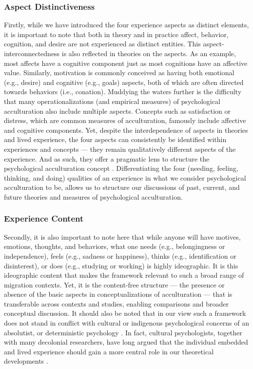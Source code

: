 \documentclass[man, 12pt, a4paper, mask]{apa7}
\begin{document}
\subsubsection{Aspect Distinctiveness}
Firstly, while we have introduced the four experience aspects as distinct elements, it is important to note that both in theory and in practice affect, behavior, cognition, and desire are not experienced as distinct entities. This aspect-interconnectedness is also reflected in theories on the aspects. As an example, most affects have a cognitive component just as most cognitions have an affective value. Similarly, motivation is commonly conceived as having both emotional (e.g., desire) and cognitive (e.g., goals) aspects, both of which are often directed towards behaviors (i.e., conation). Muddying the waters further is the difficulty that many operationalizations (and empirical measures) of psychological acculturation also include multiple aspects. Concepts such as satisfaction or distress, which are common measures of acculturation, famously include affective and cognitive components. Yet, despite the interdependence of aspects in theories and lived experience, the four aspects can consistently be identified within experiences and concepts --- they remain qualitatively different aspects of the experience. And as such, they offer a pragmatic lens to structure the psychological acculturation concept \citep{Kuhn1962}. Differentiating the four (needing, feeling, thinking, and doing) qualities of an experience in what we consider psychological acculturation to be, allows us to structure our discussions of past, current, and future theories and measures of psychological acculturation.

\subsubsection{Experience Content}
Secondly, it is also important to note here that while anyone will have motives, emotions, thoughts, and behaviors, what one needs (e.g., belongingness or independence), feels (e.g., sadness or happiness), thinks (e.g., identification or disinterest), or does (e.g., studying or working) is highly ideographic. It is this ideographic content that makes the framework relevant to such a broad range of migration contexts. Yet, it is the content-free structure --- the presence or absence of the basic aspects in conceptualizations of acculturation --- that is transferable across contexts and studies, enabling comparisons and broader conceptual discussion. It should also be noted that in our view such a framework does not stand in conflict with cultural or indigenous psychological concerns of an absolutist, or deterministic psychology \citep[e.g.,][]{Kim2006a}. In fact, cultural psychologists, together with many decolonial researchers, have long argued that the individual embedded and lived experience should gain a more central role in our theoretical developments \citep[e.g., ontological turn;][]{Pedersen2020}.
\end{document}
